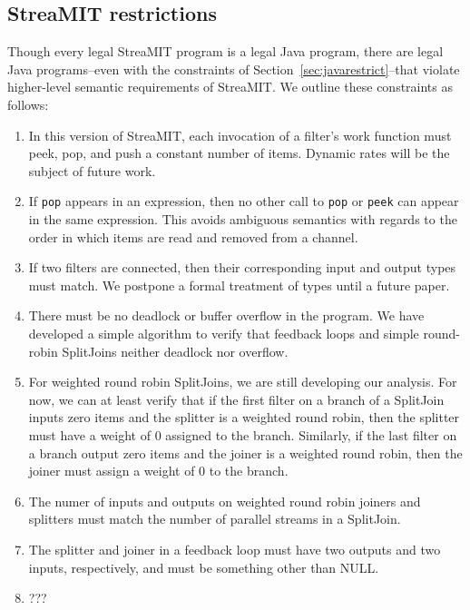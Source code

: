 \subsection{StreaMIT restrictions}

Though every legal StreaMIT program is a legal Java program, there are
legal Java programs--even with the constraints of
Section~\ref{sec:javarestrict}--that violate higher-level semantic
requirements of StreaMIT.  We outline these constraints as follows:

\begin{enumerate}

\item In this version of StreaMIT, each invocation of a filter's work
function must peek, pop, and push a constant number of items.  Dynamic
rates will be the subject of future work.

\item If {\tt pop} appears in an expression, then no other call to
{\tt pop} or {\tt peek} can appear in the same expression.  This
avoids ambiguous semantics with regards to the order in which items
are read and removed from a channel.

\item If two filters are connected, then their corresponding input and
output types must match.  We postpone a formal treatment of types
until a future paper.

\item There must be no deadlock or buffer overflow in the program.  We
have developed a simple algorithm to verify that feedback loops and
simple round-robin SplitJoins neither deadlock nor overflow.

\item For weighted round robin SplitJoins, we are still developing our
analysis.  For now, we can at least verify that if the first filter on
a branch of a SplitJoin inputs zero items and the splitter is a
weighted round robin, then the splitter must have a weight of 0
assigned to the branch.  Similarly, if the last filter on a branch
output zero items and the joiner is a weighted round robin, then the
joiner must assign a weight of 0 to the branch.

\item The numer of inputs and outputs on weighted round robin joiners
and splitters must match the number of parallel streams in a
SplitJoin.

\item The splitter and joiner in a feedback loop must have two outputs
and two inputs, respectively, and must be something other than NULL.

\item ???

\end{enumerate}


